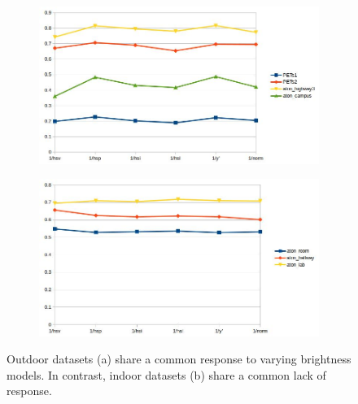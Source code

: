 \documentclass[12pt]{report}
\begin{document}
\begin{figure}
\centering
\begin{subfigure}{.8\linewidth}
  \includegraphics[width=1\linewidth]{figures/brightness/db/correlation_outside.jpg}
  \caption{}
\end{subfigure}
\hfill
\begin{subfigure}{.8\linewidth}
  \includegraphics[width=1\linewidth]{figures/brightness/db/correlation_inside.jpg}
  \caption{}
\end{subfigure}

\caption{Outdoor datasets (a) share a common response to varying brightness models. In contrast, indoor datasets (b) share a common lack of response.}
\label{fig:brightness_indoor_outdoor}
\end{figure}
\end{document}
